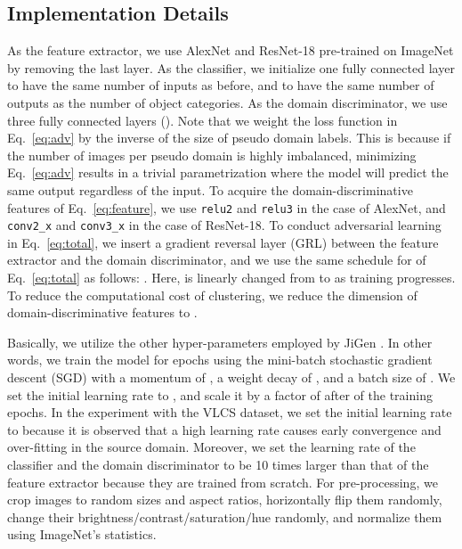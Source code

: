 \documentclass[letterpaper]{article} \usepackage{aaai20}  \usepackage{times}  \usepackage{helvet} \usepackage{courier}  \usepackage[hyphens]{url}  \usepackage{graphicx} \urlstyle{rm} \def\UrlFont{\rm}  \usepackage{graphicx}  \usepackage[whole]{bxcjkjatype}
\begin{document}
\subsection{Implementation Details}
As the feature extractor, we use AlexNet and ResNet-18 pre-trained on ImageNet by removing the last layer. As the classifier, we initialize one fully connected layer to have the same number of inputs as before, and to have the same number of outputs as the number of object categories.
As the domain discriminator, we use three fully connected layers ().
Note that we weight the loss function in Eq.~\ref{eq:adv} by the inverse of the size of pseudo domain labels.
This is because if the number of images per pseudo domain is highly imbalanced, minimizing Eq.~\ref{eq:adv} results in a trivial parametrization where the model will predict the same output regardless of the input.
To acquire the domain-discriminative features of Eq.~\ref{eq:feature}, we use \texttt{relu2} and \texttt{relu3} in the case of AlexNet, and \texttt{conv2\_x} and \texttt{conv3\_x} in the case of ResNet-18.
To conduct adversarial learning in Eq.~\ref{eq:total}, we insert a gradient reversal layer (GRL) \cite{GRL} between the feature extractor and the domain discriminator, and we use the same schedule for  of Eq.~\ref{eq:total} as follows: .
Here,  is linearly changed from  to  as training progresses.
To reduce the computational cost of clustering, we reduce the dimension of domain-discriminative features to .\par
Basically, we utilize the other hyper-parameters employed by JiGen \cite{JiGen}. In other words, we train the model for  epochs using the mini-batch stochastic gradient descent (SGD) with a momentum of , a weight decay of , and a batch size of .
We set the initial learning rate to , and scale it by a factor of  after  of the training epochs.
In the experiment with the VLCS dataset, we set the initial learning rate to  because it is observed that a high learning rate causes early convergence and over-fitting in the source domain.
Moreover, we set the learning rate of the classifier and the domain discriminator to be 10 times larger than that of the feature extractor because they are trained from scratch.
For pre-processing, we crop images to random sizes and aspect ratios, horizontally flip them randomly, change their brightness/contrast/saturation/hue randomly, and normalize them using ImageNet's statistics.
\end{document}
